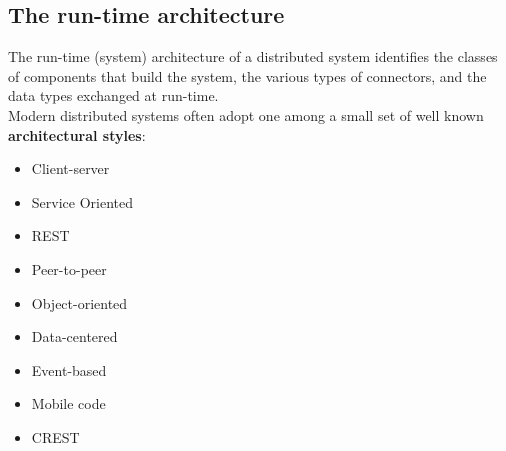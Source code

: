 \documentclass[10pt,a4paper]{article}
\begin{document}
\subsection{The run-time architecture}
The run-time (system) architecture of a distributed system identifies the classes of components that build the system, the various types of connectors, and the data types exchanged at run-time. \\
Modern distributed systems often adopt one among a small set of well known \textbf{architectural styles}:
\begin{itemize}
	\item Client-server
	\item Service Oriented
	\item REST
	\item Peer-to-peer
	\item Object-oriented
	\item Data-centered
	\item Event-based
	\item Mobile code
	\item CREST
\end{itemize}
\end{document}
